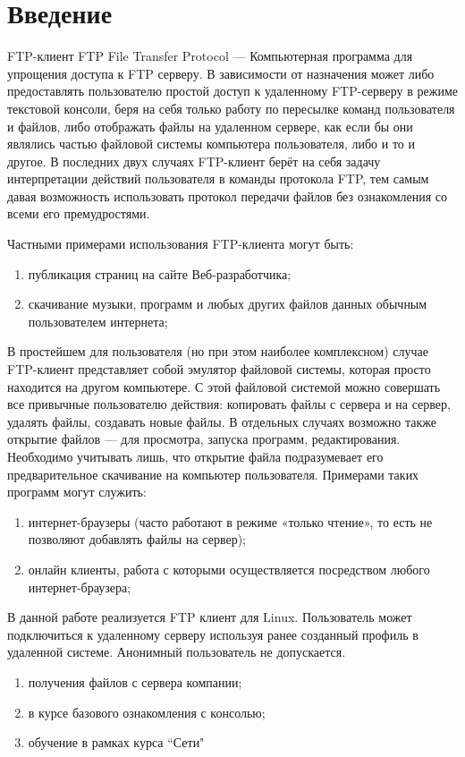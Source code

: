 \section{Введение}
FTP-клиент  FTP File Transfer Protocol — Компьютерная программа для упрощения доступа к FTP серверу. 
В зависимости от назначения может либо предоставлять пользователю простой доступ к удаленному FTP-серверу в режиме текстовой консоли, беря на себя только работу по пересылке команд пользователя и файлов, либо отображать файлы на удаленном сервере, как если бы они являлись частью файловой системы компьютера пользователя, либо и то и другое. 
В последних двух случаях FTP-клиент берёт на себя задачу интерпретации действий пользователя в команды протокола FTP, тем самым давая возможность использовать протокол передачи файлов без ознакомления со всеми его премудростями.

Частными примерами использования FTP-клиента могут быть:
\begin{enumerate}
	\item публикация страниц на сайте Веб-разработчика;
	\item скачивание музыки, программ и любых других файлов данных обычным пользователем интернета;
\end{enumerate}

В простейшем для пользователя (но при этом наиболее комплексном) случае FTP-клиент представляет собой эмулятор файловой системы, которая просто находится на другом компьютере. 
С этой файловой системой можно совершать все привычные пользователю действия: копировать файлы с сервера и на сервер, удалять файлы, создавать новые файлы. 
В отдельных случаях возможно также открытие файлов — для просмотра, запуска программ, редактирования. 
Необходимо учитывать лишь, что открытие файла подразумевает его предварительное скачивание на компьютер пользователя. Примерами таких программ могут служить:
\begin{enumerate}
	\item интернет-браузеры (часто работают в режиме «только чтение», то есть не позволяют добавлять файлы на сервер);
	\item онлайн клиенты, работа с которыми осуществляется посредством любого интернет-браузера;
\end{enumerate}

В данной работе реализуется FTP клиент для Linux. Пользователь может подключиться к удаленному серверу используя ранее созданный профиль в удаленной системе. 
Анонимный пользователь не допускается.
\begin{enumerate}
	\item получения файлов с сервера компании;
	\item в курсе базового ознакомления с консолью;
	\item обучение в рамках курса “Сети"
\end{enumerate}

